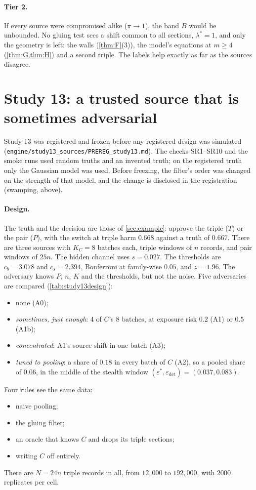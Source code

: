 \documentclass[11pt]{article}
\theoremstyle{definition}\newtheorem{definition}{Definition}\newtheorem{remark}{Remark}
\begin{document}
\paragraph{Tier 2.} If every source were compromised alike ($\pi\to1$), the band $B$ would be unbounded. No gluing test sees a shift
common to all sections, $\lambda^*=1$, and only the geometry is left: the walls (\cref{thm:F}(3)), the model's equations at $m\ge4$
(\cref{thm:G,thm:H}) and a second triple. The labels help exactly as far as the sources disagree.

\section{Study 13: a trusted source that is sometimes adversarial}\label{sec:study13}
Study 13 was registered and frozen before any registered design was simulated
(\texttt{engine/\allowbreak study13\_sources/\allowbreak PREREG\_study13.md}). The checks SR1--SR10 and the smoke runs used random
truths and an invented truth; on the registered truth only the Gaussian model was used. Before freezing, the filter's order was changed
on the strength of that model, and the change is disclosed in the registration (swamping, above).

\paragraph{Design.} The truth and the decision are those of \cref{sec:example}: approve the triple ($T$) or the pair ($P$), with the
switch at triple harm $0.668$ against a truth of $0.667$. There are three sources with $K_C=8$ batches each, triple windows of $n$
records, and pair windows of $25n$. The hidden channel uses $s=0.027$. The thresholds are $c_b=3.078$ and $c_s=2.394$, Bonferroni at
family-wise $0.05$, and $z=1.96$. The adversary knows $P$, $n$, $K$ and the thresholds, but not the noise. Five adversaries are
compared (\cref{tab:study13design}):
\begin{itemize}
\item none (A0);
\item \emph{sometimes, just enough}: $4$ of $C$'s $8$ batches, at exposure risk $0.2$ (A1) or $0.5$ (A1b);
\item \emph{concentrated}: A1's source shift in one batch (A3);
\item \emph{tuned to pooling}: a share of $0.18$ in every batch of $C$ (A2), so a pooled share of $0.06$, in the middle of the stealth
  window $(\varepsilon^*,\varepsilon_{\det})=(0.037,0.083)$.
\end{itemize}
Four rules see the same data:
\begin{itemize}
\item naive pooling;
\item the gluing filter;
\item an oracle that knows $C$ and drops its triple sections;
\item writing $C$ off entirely.
\end{itemize}
There are $N=24n$ triple records in all, from $12{,}000$ to $192{,}000$, with $2000$ replicates per cell.
\end{document}
